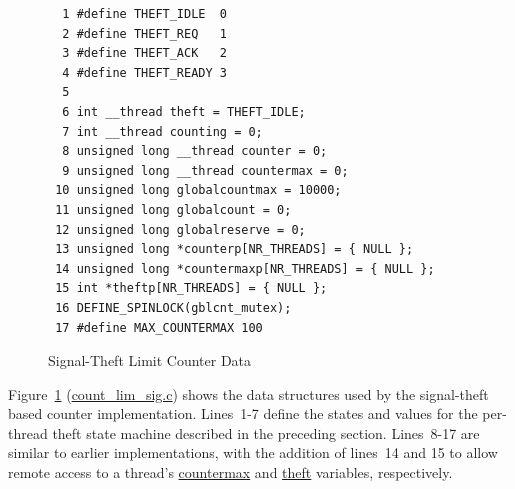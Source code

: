 \begin{figure}[tbp]
{ \scriptsize
\begin{verbatim}
  1 #define THEFT_IDLE  0
  2 #define THEFT_REQ   1
  3 #define THEFT_ACK   2
  4 #define THEFT_READY 3
  5 
  6 int __thread theft = THEFT_IDLE;
  7 int __thread counting = 0;
  8 unsigned long __thread counter = 0;
  9 unsigned long __thread countermax = 0;
 10 unsigned long globalcountmax = 10000;
 11 unsigned long globalcount = 0;
 12 unsigned long globalreserve = 0;
 13 unsigned long *counterp[NR_THREADS] = { NULL };
 14 unsigned long *countermaxp[NR_THREADS] = { NULL };
 15 int *theftp[NR_THREADS] = { NULL };
 16 DEFINE_SPINLOCK(gblcnt_mutex);
 17 #define MAX_COUNTERMAX 100
\end{verbatim}
}
\caption{Signal-Theft Limit Counter Data}
\label{fig:count:Signal-Theft Limit Counter Data}
\end{figure}

Figure~\ref{fig:count:Signal-Theft Limit Counter Data}
(\url{count_lim_sig.c})
shows the data structures used by the signal-theft based counter
implementation.
Lines~1-7 define the states and values for the per-thread theft state machine
described in the preceding section.
Lines~8-17 are similar to earlier implementations, with the addition of
lines~14 and 15 to allow remote access to a thread's \url{countermax}
and \url{theft} variables, respectively.

